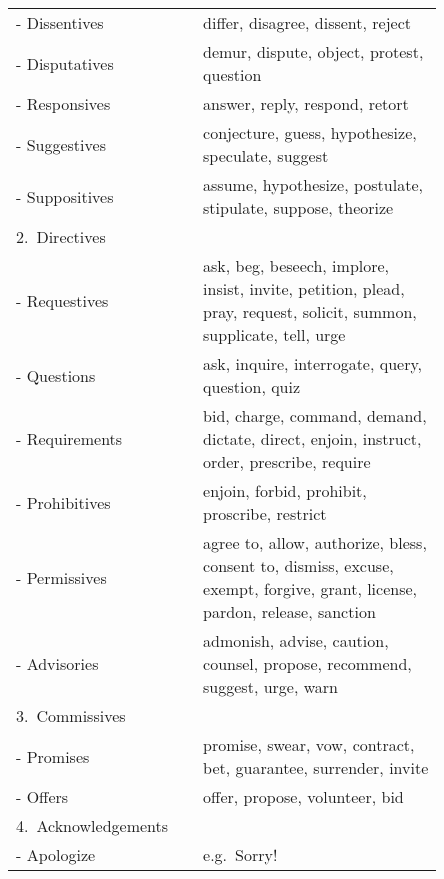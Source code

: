 \begin{longtable}[c]{@{}%
	>{\raggedright\arraybackslash}p{0.35\linewidth}%
	>{\raggedright\arraybackslash}p{0.5\linewidth}%
	@{}}
\hspace{5mm}- Dissentives & differ, disagree, dissent, reject \\
\hspace{5mm}- Disputatives & demur, dispute, object, protest, question \\
\hspace{5mm}- Responsives & answer, reply, respond, retort \\
\hspace{5mm}- Suggestives & conjecture, guess, hypothesize, speculate, suggest \\
\hspace{5mm}- Suppositives & assume, hypothesize, postulate, stipulate, suppose, theorize \\
\midrule
\mbox{2. Directives} & \\
\hspace{5mm}- Requestives & ask, beg, beseech, implore, insist, invite, petition, plead, pray, request, solicit, summon, supplicate, tell, urge \\
\hspace{5mm}- Questions & ask, inquire, interrogate, query, question, quiz \\
\hspace{5mm}- Requirements & bid, charge, command, demand, dictate, direct, enjoin, instruct, order, prescribe, require \\
\hspace{5mm}- Prohibitives & enjoin, forbid, prohibit, proscribe, restrict \\
\hspace{5mm}- Permissives & agree to, allow, authorize, bless, consent to, dismiss, excuse, exempt, forgive, grant, license, pardon, release, sanction \\
\hspace{5mm}- Advisories & admonish, advise, caution, counsel, propose, recommend, suggest, urge, warn \\
\midrule
\mbox{3. Commissives} & \\
\hspace{5mm}- Promises & promise, swear, vow, contract, bet, guarantee, surrender, invite \\
\hspace{5mm}- Offers & offer, propose, volunteer, bid \\
\midrule
\mbox{4. Acknowledgements} & \\
\hspace{5mm}- Apologize & e.g.\ Sorry! \\

\end{longtable}
